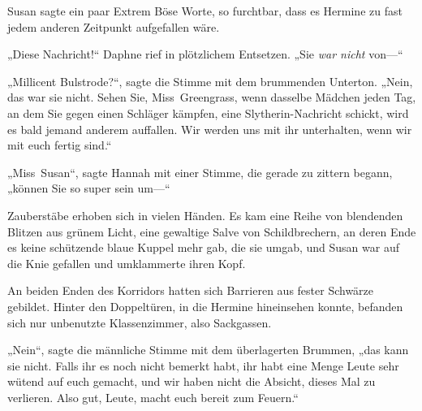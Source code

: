 Susan sagte ein paar Extrem Böse Worte, so furchtbar, dass es Hermine zu fast jedem anderen Zeitpunkt aufgefallen wäre.

„Diese Nachricht!“ Daphne rief in plötzlichem Entsetzen.
„Sie \emph{war nicht} von—“

„Millicent Bulstrode?“, sagte die Stimme mit dem brummenden Unterton.
„Nein, das war sie nicht. Sehen Sie, Miss~Greengrass, wenn dasselbe Mädchen jeden Tag, an dem Sie gegen einen Schläger kämpfen, eine Slytherin-Nachricht schickt, wird es bald jemand anderem auffallen. Wir werden uns mit ihr unterhalten, wenn wir mit euch fertig sind.“

„Miss~Susan“, sagte Hannah mit einer Stimme, die gerade zu zittern begann, „können Sie so super sein um—“

Zauberstäbe erhoben sich in vielen Händen. Es kam eine Reihe von blendenden Blitzen aus grünem Licht, eine gewaltige Salve von Schildbrechern, an deren Ende es keine schützende blaue Kuppel mehr gab, die sie umgab, und Susan war auf die Knie gefallen und umklammerte ihren Kopf.

An beiden Enden des Korridors hatten sich Barrieren aus fester Schwärze gebildet. Hinter den Doppeltüren, in die Hermine hineinsehen konnte, befanden sich nur unbenutzte Klassenzimmer, also Sackgassen.

„Nein“, sagte die männliche Stimme mit dem überlagerten Brummen, „das kann sie nicht. Falls ihr es noch nicht bemerkt habt, ihr habt eine Menge Leute sehr wütend auf euch gemacht, und wir haben nicht die Absicht, dieses Mal zu verlieren. Also gut, Leute, macht euch bereit zum Feuern.“

